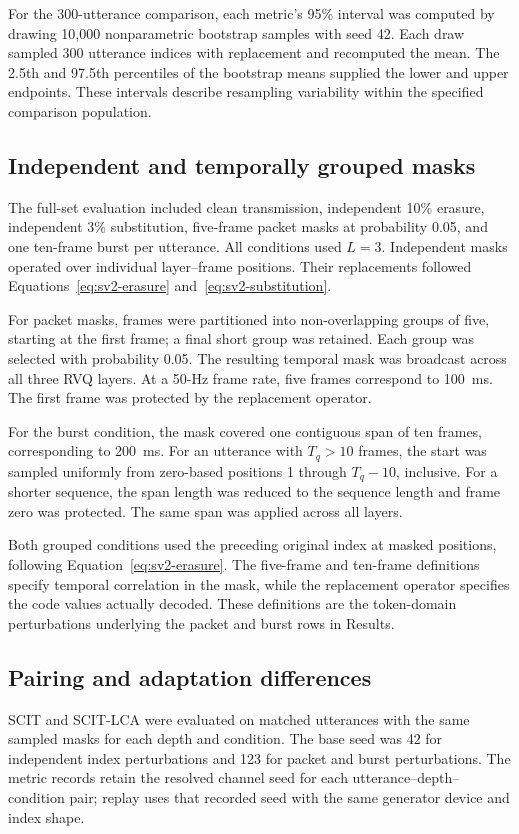 For the 300-utterance comparison, each metric's 95\% interval was computed by drawing 10,000 nonparametric bootstrap samples with seed 42. Each draw sampled 300 utterance indices with replacement and recomputed the mean. The 2.5th and 97.5th percentiles of the bootstrap means supplied the lower and upper endpoints. These intervals describe resampling variability within the specified comparison population.

\subsection{Independent and temporally grouped masks}
The full-set evaluation included clean transmission, independent 10\% erasure, independent 3\% substitution, five-frame packet masks at probability 0.05, and one ten-frame burst per utterance. All conditions used $L=3$. Independent masks operated over individual layer--frame positions. Their replacements followed Equations~\ref{eq:sv2-erasure} and~\ref{eq:sv2-substitution}.

For packet masks, frames were partitioned into non-overlapping groups of five, starting at the first frame; a final short group was retained. Each group was selected with probability 0.05. The resulting temporal mask was broadcast across all three RVQ layers. At a 50-Hz frame rate, five frames correspond to 100~ms. The first frame was protected by the replacement operator.

For the burst condition, the mask covered one contiguous span of ten frames, corresponding to 200~ms. For an utterance with $T_q>10$ frames, the start was sampled uniformly from zero-based positions 1 through $T_q-10$, inclusive. For a shorter sequence, the span length was reduced to the sequence length and frame zero was protected. The same span was applied across all layers.

Both grouped conditions used the preceding original index at masked positions, following Equation~\ref{eq:sv2-erasure}. The five-frame and ten-frame definitions specify temporal correlation in the mask, while the replacement operator specifies the code values actually decoded. These definitions are the token-domain perturbations underlying the packet and burst rows in Results.

\subsection{Pairing and adaptation differences}
SCIT and SCIT-LCA were evaluated on matched utterances with the same sampled masks for each depth and condition. The base seed was 42 for independent index perturbations and 123 for packet and burst perturbations. The metric records retain the resolved channel seed for each utterance--depth--condition pair; replay uses that recorded seed with the same generator device and index shape.

